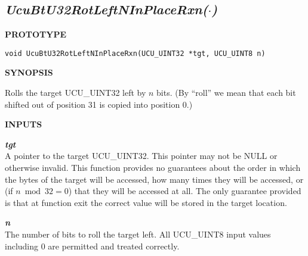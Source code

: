 \subsection[\emph{UcuBtU32RotLeftNInPlaceRxn(\protect\mbox{\protect$\cdot$})}]
           {\emph{UcuBtU32RotLeftNInPlaceRxn(\protect\mbox{\protect\boldmath $\cdot$})}}
\label{cbsf0:srof0:srle0}

%

\noindent\textbf{PROTOTYPE}
\begin {list}{}{\setlength{\leftmargin}{0.25in}\setlength{\topsep}{0.0in}}
\item
\begin{verbatim}
void UcuBtU32RotLeftNInPlaceRxn(UCU_UINT32 *tgt, UCU_UINT8 n)
\end{verbatim}
\end{list}
\vspace{2.8ex}

\noindent\textbf{SYNOPSIS}
\begin{list}{}{\setlength{\leftmargin}{0.25in}\setlength{\topsep}{0.0in}}
\item Rolls the target UCU\_UINT32 left by $n$ bits.  (By ``roll'' we mean
      that each bit shifted
      out of position 31 is copied into position 0.)
\end{list}
\vspace{2.8ex}

\noindent\textbf{INPUTS}
\begin{list}{}{\setlength{\leftmargin}{0.5in}\setlength{\itemindent}{-0.25in}\setlength{\topsep}{0.0in}\setlength{\partopsep}{0.0in}}
\item \emph{\textbf{tgt}}\\
      A pointer to the target UCU\_UINT32.  This pointer may not be
      NULL or otherwise invalid.  This function provides no guarantees
      about the order in which the bytes of the target will be accessed,
      how many times they will be accessed, or (if $n \bmod 32 = 0$) that
      they will be accessed at all.  The only guarantee provided is that
      at function exit the correct value will be stored in the target location.
\item \emph{\textbf{n}}\\
      The number of bits to roll the target left.
      All UCU\_UINT8 input values including 0
      are permitted and treated correctly.
\end{list}
\vspace{2.8ex}

